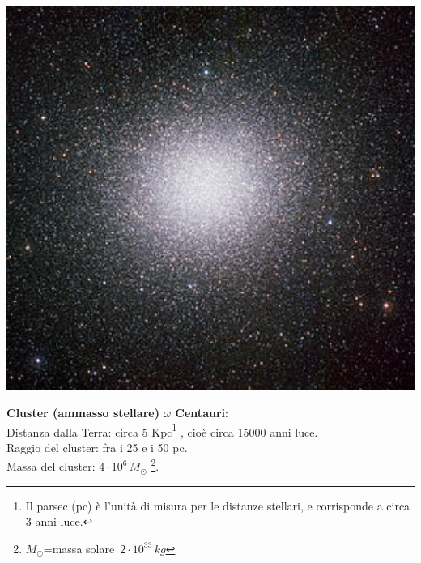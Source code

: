 \clearpage
\begin{minipage}{.3\textwidth}
\centering
\includegraphics[width=1\textwidth]{Img/w_centauri.jpg}
\end{minipage}
\begin{minipage}{.65\textwidth}
\textbf{Cluster (ammasso stellare) $\omega$ Centauri}:\\
Distanza dalla Terra: circa 5 Kpc\footnote{Il parsec (pc) è l'unità di misura per le distanze stellari, e corrisponde a circa 3 anni luce.} , cioè circa 15000 anni luce.\\
Raggio del cluster: fra i 25 e i 50 pc.\\
Massa del cluster: $4 \cdot 10^6 \, M_\odot$ \footnote{$M_\odot$=massa solare~$2 \cdot 10^{33} \, kg$}.
\end{minipage}

\vspace{0.2cm}

